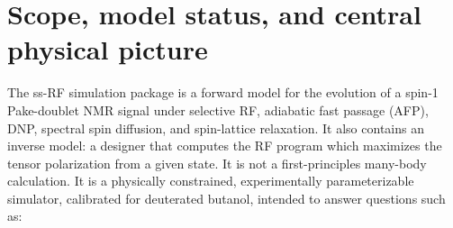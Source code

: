 \documentclass[11pt]{article}
\begin{document}
\begin{abstract}
The note then documents:
\begin{itemize}
\item the time integrator;
\item the tensor-polarization optimizer, a discrete-adjoint, constrained search for the RF program
that maximizes $Q$ under power and energy limits;
\item the calibrated d-butanol materials;
\item a command-line training-data generator, including a closed-loop mode that reproduces the
operating cycle;
\item the machine-learning models trained on its output;
\item the graphical interface, the regression tests, and a staged calibration procedure.
\end{itemize}
It also quantifies the peak--pedestal saturation balance with the calibrated materials. It
supersedes the first-release note, \emph{Real-Time ss-RF Simulation Package:
Spin-Capacity-Weighted DNP, Depolarization, and Recovery}, and \cref{sec:changes} lists what
changed and why. Exact spin-1 bookkeeping is kept separate from phenomenological closures
throughout.
\end{abstract}

\tableofcontents
\clearpage

\section{Scope, model status, and central physical picture}
\label{sec:scope}

The ss-RF simulation package is a forward model for the evolution of a spin-1 Pake-doublet NMR
signal under selective RF, adiabatic fast passage (AFP), DNP, spectral spin diffusion, and
spin-lattice relaxation. It also contains an inverse model: a designer that computes the RF
program which maximizes the tensor polarization from a given state. It is not a first-principles
many-body calculation. It is a physically constrained, experimentally parameterizable simulator,
calibrated for deuterated butanol, intended to answer questions such as:
\end{document}
